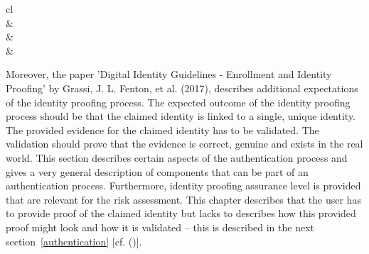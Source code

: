 \begin{table}[h]
	\centering
	\begingroup
	\setlength{\tabcolsep}{10pt} %
	\renewcommand{\arraystretch}{1.5} %
	\begin{tabular}{cl}
		\hline
		                                                                                                                                                                   \\ \hline
		 &    \\ \hline
		 &  \\ \hline
		 &                                             \\ \hline
	\end{tabular}
	\endgroup
	\caption{Identity Assurance Levels (\cite{NIST:2017:DIG}, p.18)} \label{tab:ial}
\end{table}
\pagebreak[4]
Moreover, the paper 'Digital Identity Guidelines - Enrollment and Identity Proofing' by Grassi, J. L. Fenton, et al. (2017), describes additional expectations of the identity proofing process. The expected outcome of the identity proofing process should be that the claimed identity is linked to a single, unique identity. The provided evidence for the claimed identity has to be validated. The validation should prove that the evidence is correct, genuine and exists in the real world.
This section describes certain aspects of the authentication process and gives a very general description of components that can be part of an authentication process. Furthermore, identity proofing assurance level is provided that are relevant for the risk assessment. This chapter describes that the user has to provide proof of the claimed identity but lacks to describes how this provided proof might look and how it is validated – this is described in the next section~\ref{authentication} [cf. (\cite{NIST:2017:DIGEIP})].
	

